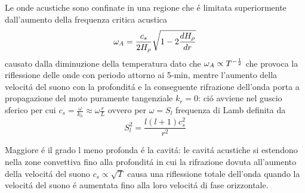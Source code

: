 \documentclass[../main.tex]{subfiles}
\begin{document}
\begin{minipage}{\linewidth}
\end{minipage}



Le onde acustiche sono confinate in una regione che \'e limitata superiormente dall'aumento della frequenza critica acustica
\begin{equation}
\omega_A=\frac{c_s}{2H_{\rho}{}}\sqrt{1-2\frac{d H_{\rho}{}}{d r}}\label{eq:acusticcutoff}
\end{equation}
causato dalla diminuzione della temperatura dato che $\omega_A\propto T^{-\frac{1}{2}}$ che provoca la riflessione delle onde con periodo attorno ai 5-min, mentre l'aumento della velocit\'a del suono con la profondit\'a e la conseguente rifrazione dell'onda porta a propagazione del moto puramente tangenziale $k_r=0$: ci\'o avviene nel guscio sferico per cui $c_s=\frac{\omega}{k_h}\approx\omega \frac{r}{L}$ ovvero per $\omega=S_l$ frequenza di Lamb definita da
\begin{equation}
S_l^2=\frac{l(l+1)c_s^2}{r^2}\label{eq:Lambf}
\end{equation}

Maggiore \'e il grado l meno profonda \'e la cavit\'a: le cavit\'a acustiche si estendono nella zone convettiva fino alla profondit\'a in cui la rifrazione dovuta all'aumento della velocit\'a del suono $c_s\propto\sqrt{T}$ causa una riflessione totale dell'onda quando la velocit\'a del suono \'e aumentata fino alla loro velocit\'a di fase orizzontale.
\end{document}
